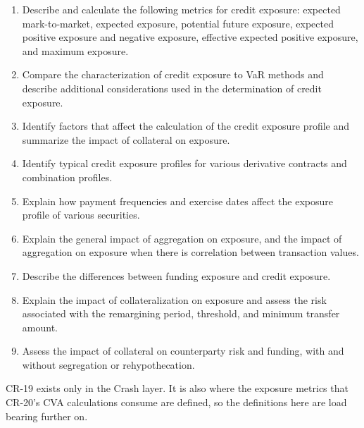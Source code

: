 
\begin{crkeybox}
\begin{enumerate}[label=\textbf{\alph*.},leftmargin=2em]
\item Describe and calculate the following metrics for credit exposure: expected mark-to-market, expected exposure, potential future exposure, expected positive exposure and negative exposure, effective expected positive exposure, and maximum exposure.
\item Compare the characterization of credit exposure to VaR methods and describe additional considerations used in the determination of credit exposure.
\item Identify factors that affect the calculation of the credit exposure profile and summarize the impact of collateral on exposure.
\item Identify typical credit exposure profiles for various derivative contracts and combination profiles.
\item Explain how payment frequencies and exercise dates affect the exposure profile of various securities.
\item Explain the general impact of aggregation on exposure, and the impact of aggregation on exposure when there is correlation between transaction values.
\item Describe the differences between funding exposure and credit exposure.
\item Explain the impact of collateralization on exposure and assess the risk associated with the remargining period, threshold, and minimum transfer amount.
\item Assess the impact of collateral on counterparty risk and funding, with and without segregation or rehypothecation.
\end{enumerate}
\end{crkeybox}

\begin{crtrapbox}
CR-19 exists only in the Crash layer. It is also where the exposure metrics that
CR-20's CVA calculations consume are defined, so the definitions here are load
bearing further on.
\end{crtrapbox}


